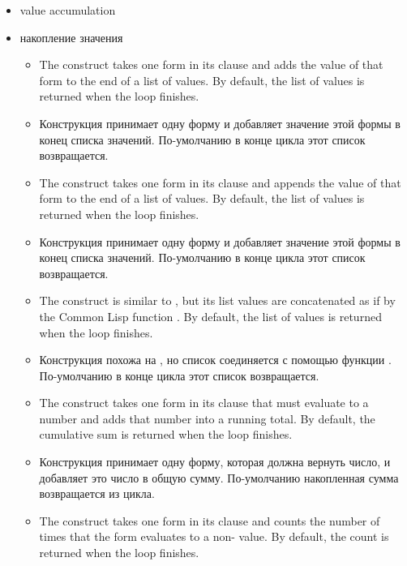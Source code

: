 \begin{itemize}
\item value accumulation

\item накопление значения

  \begin{itemize}
  \item The  construct takes one form in its clause and
    adds the value of that form to the end of a list of values.  By
    default, the list of values is returned when the loop finishes.

  \item Конструкция  принимает одну форму и добавляет
    значение этой формы в конец списка значений. По-умолчанию в конце
    цикла этот список возвращается.

  \item The  construct takes one form in its clause and
    appends the value of that form to the end of a list of values.  By
    default, the list of values is returned when the loop finishes.

  \item Конструкция  принимает одну форму и добавляет
    значение этой формы в конец списка значений. По-умолчанию в конце
    цикла этот список возвращается.

  \item The  construct is similar to , but its
    list values are concatenated as if by the Common Lisp function
    .  By default, the list of values is returned when the
    loop finishes.

  \item Конструкция  похожа на , но список
    соединяется с помощью функции . По-умолчанию в конце
    цикла этот список возвращается.

  \item The  construct takes one form in its clause that must
    evaluate to a number and adds that number into a running total.
    By default, the cumulative sum is returned when the loop finishes.

  \item Конструкция  принимает одну форму, которая должна
    вернуть число, и добавляет это число в общую сумму. По-умолчанию
    накопленная сумма возвращается из цикла.

  \item The  construct takes one form in its clause and
    counts the number of times that the form evaluates to a
    non- value.  By default, the count is returned when the
    loop finishes.


\end{itemize}
\end{itemize}
